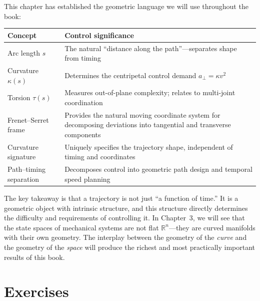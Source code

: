 \documentclass[12pt, openany]{book}
\theoremstyle{plain}
\newcommand{\Reals}{\mathbb{R}}
\begin{document}
This chapter has established the geometric language we will use throughout the
book:

\begin{center}
\renewcommand{\arraystretch}{1.4}
\begin{tabular}{@{} l p{9cm} @{}}
  \toprule
  \textbf{Concept} & \textbf{Control significance} \\
  \midrule
  Arc length $s$ & The natural ``distance along the path''---separates shape
    from timing \\
  Curvature $\kappa(s)$ & Determines the centripetal control demand
    $a_\perp = \kappa v^2$ \\
  Torsion $\tau(s)$ & Measures out-of-plane complexity; relates to
    multi-joint coordination \\
  Frenet--Serret frame & Provides the natural moving coordinate system for
    decomposing deviations into tangential and transverse components \\
  Curvature signature & Uniquely specifies the trajectory shape, independent
    of timing and coordinates \\
  Path--timing separation & Decomposes control into geometric path design and
    temporal speed planning \\
  \bottomrule
\end{tabular}
\end{center}

\vspace{0.5cm}

The key takeaway is that a trajectory is not just ``a function of time.'' It is a
geometric object with intrinsic structure, and this structure directly determines
the difficulty and requirements of controlling it. In Chapter~3, we will see that
the state spaces of mechanical systems are not flat $\Reals^n$---they are curved
manifolds with their own geometry. The interplay between the geometry of the
\emph{curve} and the geometry of the \emph{space} will produce the richest and
most practically important results of this book.

\section{Exercises}
\end{document}
